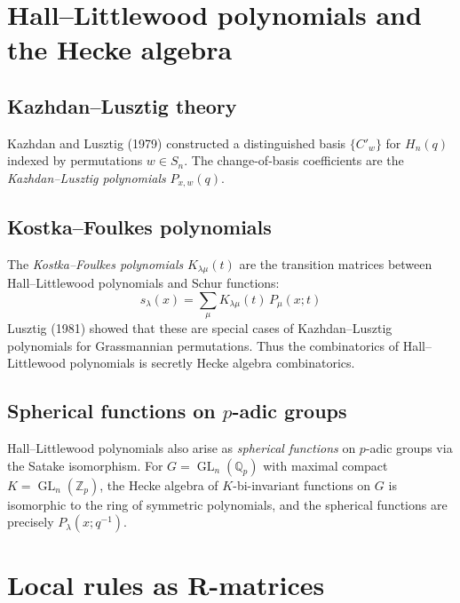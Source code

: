 \documentclass[12pt]{article}
\DeclareMathOperator{\GL}{GL}
\begin{document}
\section{Hall--Littlewood polynomials and the Hecke algebra}

\subsection{Kazhdan--Lusztig theory}

Kazhdan and Lusztig (1979) constructed a distinguished basis $\{C'_w\}$
for $H_n(q)$ indexed by permutations $w \in S_n$. The change-of-basis
coefficients are the \emph{Kazhdan--Lusztig polynomials} $P_{x,w}(q)$.

\subsection{Kostka--Foulkes polynomials}

The \emph{Kostka--Foulkes polynomials} $K_{\lambda\mu}(t)$ are the
transition matrices between Hall--Littlewood polynomials and Schur functions:
\[
  s_\lambda(x) = \sum_\mu K_{\lambda\mu}(t)\, P_\mu(x; t)
\]
Lusztig (1981) showed that these are special cases of Kazhdan--Lusztig
polynomials for Grassmannian permutations. Thus the combinatorics of
Hall--Littlewood polynomials is secretly Hecke algebra combinatorics.

\subsection{Spherical functions on $p$-adic groups}

Hall--Littlewood polynomials also arise as \emph{spherical functions}
on $p$-adic groups via the Satake isomorphism. For
$G = \GL_n(\mathbb{Q}_p)$ with maximal compact $K = \GL_n(\mathbb{Z}_p)$,
the Hecke algebra of $K$-bi-invariant functions on $G$ is isomorphic to the
ring of symmetric polynomials, and the spherical functions are precisely
$P_\lambda(x; q^{-1})$.

\section{Local rules as R-matrices}
\end{document}
